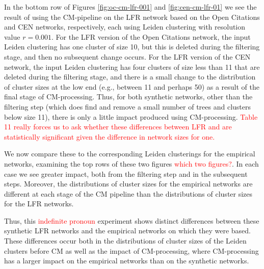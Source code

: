\documentclass[11pt]{article}   	%
\begin{document}
In the bottom row of Figures \ref{fig:oc-cm-lfr-001} and  \ref{fig:cen-cm-lfr-01} we see the result of using the CM-pipeline on the LFR network based on the Open Citations  and CEN networks, respectively, each using Leiden clustering with
resolution value $r=0.001$.
For the LFR version of the Open Citations network, the input Leiden clustering has one cluster of size 10, but this is deleted during the filtering stage, and then no subsequent change occurs.
For the LFR version of the CEN network, the input Leiden clustering has four clusters of size less than 11 that are  deleted during the filtering stage, and there is a small change to the distribution of cluster sizes at the low end (e.g., between 11 and perhaps 50) as a result of the final stage of CM-processing.
Thus, for both synthetic networks, other than the filtering step (which does find and remove a small number of trees and clusters below size 11), there is only a little
impact produced using CM-processing. \textcolor{red}{Table 11 really forces us to ask whether these differences between LFR and are statistically significant given the difference in network sizes for one.}

We now compare these to the corresponding Leiden clusterings for the empirical networks, examining the top rows of these two figures \textcolor{red}{which two figures?}.
In each case we see greater impact, both from the filtering step  and in the subsequent steps. Moreover, the distributions of cluster sizes for the empirical networks are different at each stage of the CM 
pipeline than the distributions of cluster sizes for the LFR networks.

Thus, this \textcolor{red}{indefinite pronoun} experiment shows distinct differences between these synthetic LFR networks and the empirical networks on which they were based.
These differences occur both in the distributions of cluster sizes of the Leiden clusters before CM as well as the impact of CM-processing, where CM-processing has a larger impact on the empirical networks than on the synthetic networks.
\end{document}

